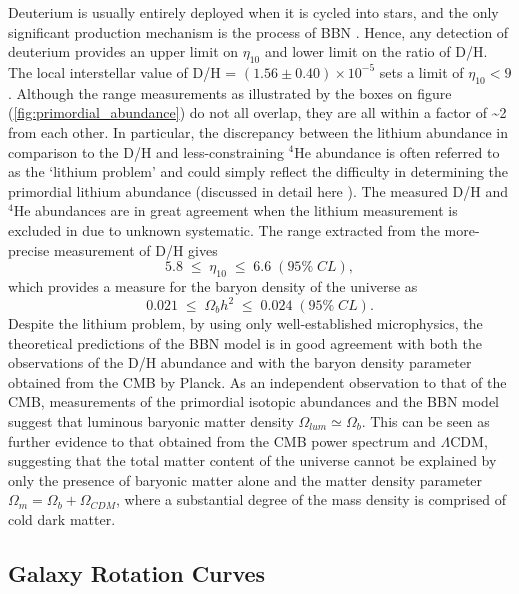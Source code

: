Deuterium is usually entirely deployed when it is cycled into stars, and the only significant production mechanism is the process of BBN \cite{pns}. Hence, any detection of deuterium provides an upper limit on $\eta_{10}$ and lower limit on the ratio of D/H. The local interstellar value of D/H = $(1.56 \pm 0.40) \times 10^{−5}$ sets a limit of $\eta_{10} < 9$ \cite{d_h_measurements}. Although the \eta range measurements as illustrated by the boxes on figure (\ref{fig:primordial_abundance}) do not all overlap, they are all within a factor of \sim2 from each other. In particular, the discrepancy between the lithium abundance in comparison to the D/H and less-constraining $^4$He abundance is often referred to as the `lithium problem' and could simply reflect the difficulty in determining the primordial lithium abundance (discussed in detail here \cite{Fields_2011}). The measured D/H and $^4$He abundances are in great agreement when the lithium measurement is excluded in due to unknown systematic. The \eta range extracted from the more-precise measurement of D/H gives
%
\begin{equation}
    5.8 \; \leq \; \eta_{10} \; \leq \; 6.6 \; (95\% \; CL),
\end{equation}
%
which provides a measure for the baryon density of the universe as
%
\begin{equation}
    0.021 \; \leq \; \Omega_{b}h^2 \; \leq \; 0.024 \; (95\% \; CL).
\end{equation}
%
Despite the lithium problem, by using only well-established microphysics, the theoretical predictions of the BBN model is in good agreement with both the observations of the D/H abundance and with the baryon density parameter obtained from the CMB by Planck. As an independent observation to that of the CMB, measurements of the primordial isotopic abundances and the BBN model suggest that luminous baryonic matter density $\Omega_{lum} \simeq \Omega_{b}$. This can be seen as further evidence to that obtained from the CMB power spectrum and $\Lambda$CDM, suggesting that the total matter content of the universe cannot be explained by only the presence of baryonic matter alone and the matter density parameter $\Omega_{m} = \Omega_{b} + \Omega_{CDM}$, where a substantial degree of the mass density is comprised of cold dark matter. 

\subsection{Galaxy Rotation Curves}
\label{subsec:rotation_curves}

